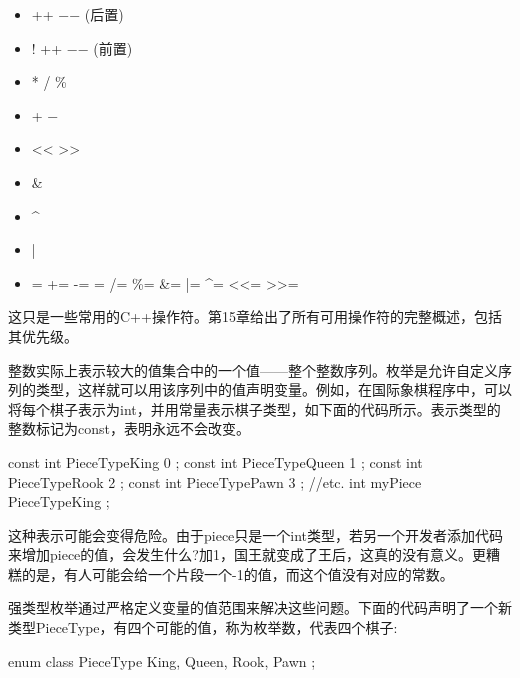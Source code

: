 \begin{itemize}
\item
++ \enspace −{}− (后置)

\item
! \enspace ++ \enspace −{}− (前置)

\item
* \enspace / \enspace \%

\item
+ \enspace −

\item
<{}< \enspace >{}>

\item
\&

\item
\textasciicircum

\item
|

\item
= \enspace += \enspace -= \enspace *= \enspace /= \enspace \%= \enspace \&= \enspace |= \enspace \textasciicircum= \enspace <{}<= \enspace >{}>=

\end{itemize}

这只是一些常用的C++操作符。第15章给出了所有可用操作符的完整概述，包括其优先级。


整数实际上表示较大的值集合中的一个值——整个整数序列。枚举是允许自定义序列的类型，这样就可以用该序列中的值声明变量。例如，在国际象棋程序中，可以将每个棋子表示为int，并用常量表示棋子类型，如下面的代码所示。表示类型的整数标记为const，表明永远不会改变。

\begin{cpp}
const int PieceTypeKing { 0 };
const int PieceTypeQueen { 1 };
const int PieceTypeRook { 2 };
const int PieceTypePawn { 3 };
//etc.
int myPiece { PieceTypeKing };
\end{cpp}

这种表示可能会变得危险。由于piece只是一个int类型，若另一个开发者添加代码来增加piece的值，会发生什么?加1，国王就变成了王后，这真的没有意义。更糟糕的是，有人可能会给一个片段一个-1的值，而这个值没有对应的常数。

强类型枚举通过严格定义变量的值范围来解决这些问题。下面的代码声明了一个新类型PieceType，有四个可能的值，称为枚举数，代表四个棋子:

\begin{cpp}
enum class PieceType { King, Queen, Rook, Pawn };
\end{cpp}

